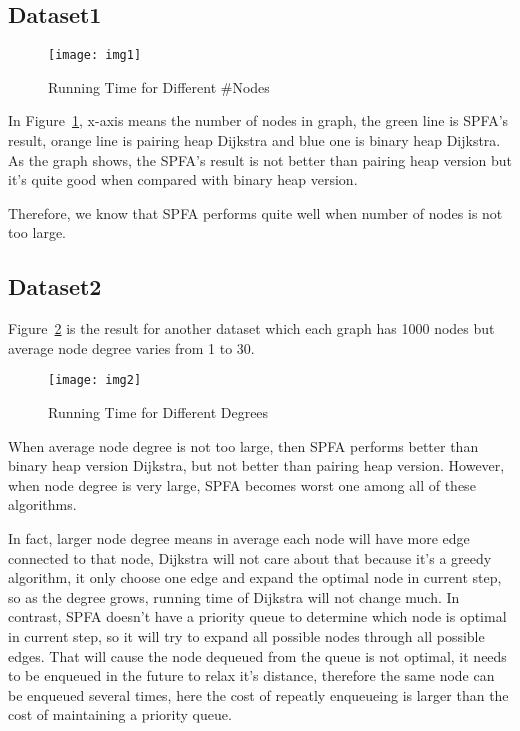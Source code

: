 \documentclass[a4paper, margin=15in]{article}
\begin{document}
\subsection{Dataset1}

\begin{figure}[h]
\centering
     \texttt{[image: img1]}
      \caption{Running Time for Different \#Nodes}
       \label{fig:nodes}
\end{figure}

In Figure~\ref{fig:nodes}, x-axis means the number of nodes in graph, the green line is SPFA's result,
orange line is pairing heap Dijkstra and blue one is binary heap Dijkstra.
As the graph shows, the SPFA's result is not better than pairing heap version
but it's quite good when compared with binary heap version.

Therefore, we know that SPFA performs quite well when number of nodes is not too large.

\subsection{Dataset2}

Figure~\ref{fig:degrees} is the result for another dataset
which each graph has 1000 nodes but average node degree varies from 1 to 30.

\begin{figure}[h]
\centering
     \texttt{[image: img2]}
      \caption{Running Time for Different Degrees}
       \label{fig:degrees}
\end{figure}

When average node degree is not too large, then SPFA performs better than binary heap version Dijkstra,
but not better than pairing heap version.
However, when node degree is very large, SPFA becomes worst one among all of these algorithms.

In fact, larger node degree means in average each node will have more edge connected to that node,
Dijkstra will not care about that because it's a greedy algorithm,
it only choose one edge and expand the optimal node in current step,
so as the degree grows, running time of Dijkstra will not change much.
In contrast, SPFA doesn't have a priority queue to determine which node is optimal in current step,
so it will try to expand all possible nodes through all possible edges.
That will cause the node dequeued from the queue is not optimal,
it needs to be enqueued in the future to relax it's distance,
therefore the same node can be enqueued several times,
here the cost of repeatly enqueueing is larger than the cost of maintaining a priority queue.
\end{document}
